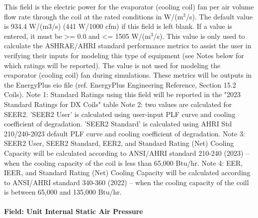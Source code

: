 This field is the electric power for the evaporator (cooling coil) fan per air volume flow rate through the coil at the rated conditions in W/(m\(^{3}\)/s). The default value is 934.4 W/(m3/s) (441 W/1000 cfm) if this field is left blank. If a value is entered, it must be \textgreater{}= 0.0 and \textless{}= 1505 W/(m\(^{3}\)/s). This value is only used to calculate the ASHRAE/AHRI standard performance metrics to assist the user in verifying their inputs for modeling this type of equipment (see Notes below for which ratings will be reported).  The value is not used for modeling the evaporator (cooling coil) fan during simulations.
These metrics will be outputs in the EnergyPlus eio file (ref. EnergyPlus Engineering Reference, Section 15.2 Coils).
Note 1: Standard Ratings using this field will be reported in the "2023 Standard Ratings for DX Coils" table
Note 2: two values are calculated for SEER2. 'SEER2 User' is calculated using user-input PLF curve and cooling coefficient of degradation. 'SEER2 Standard' is calculated using AHRI Std 210/240-2023 default PLF curve and cooling coefficient of degradation.
Note 3: SEER2 User, SEER2 Standard, EER2, and Standard Rating (Net) Cooling Capacity will be calculated according to ANSI/AHRI standard 210-240 (2023) -- when the cooling capacity of the coil is less than 65,000 Btu/hr.
Note 4: EER, IEER, and Standard Rating (Net) Cooling Capacity will be calculated according to ANSI/AHRI standard 340-360 (2022) -- when the cooling capacity of the coill is between 65,000 and 135,000 Btu/hr.

\paragraph{Field: Unit Internal Static Air Pressure}\label{field-unit-internal-static-air-pressure}

